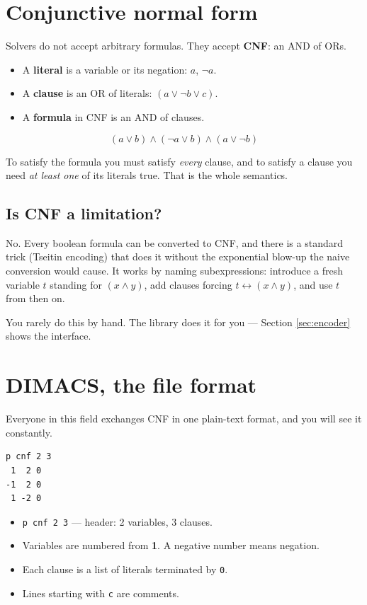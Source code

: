 \documentclass[11pt,a4paper]{article}
\begin{document}
\section{Conjunctive normal form}

Solvers do not accept arbitrary formulas. They accept \textbf{CNF}: an AND of
ORs.

\begin{itemize}
\item A \textbf{literal} is a variable or its negation: $a$, $\lnot a$.
\item A \textbf{clause} is an OR of literals: $(a \lor \lnot b \lor c)$.
\item A \textbf{formula} in CNF is an AND of clauses.
\end{itemize}

\[
(a \lor b) \land (\lnot a \lor b) \land (a \lor \lnot b)
\]

To satisfy the formula you must satisfy \emph{every} clause, and to satisfy a
clause you need \emph{at least one} of its literals true. That is the whole
semantics.

\subsection*{Is CNF a limitation?}

No. Every boolean formula can be converted to CNF, and there is a standard
trick (Tseitin encoding) that does it without the exponential blow-up the naive
conversion would cause. It works by naming subexpressions: introduce a fresh
variable $t$ standing for $(x \land y)$, add clauses forcing
$t \leftrightarrow (x \land y)$, and use $t$ from then on.

You rarely do this by hand. The library does it for you --- Section
\ref{sec:encoder} shows the interface.

\section{DIMACS, the file format}

Everyone in this field exchanges CNF in one plain-text format, and you will see
it constantly.

\begin{lstlisting}[style=out]
p cnf 2 3
 1  2 0
-1  2 0
 1 -2 0
\end{lstlisting}

\begin{itemize}
\item \texttt{p cnf 2 3} --- header: 2 variables, 3 clauses.
\item Variables are numbered from \textbf{1}. A negative number means negation.
\item Each clause is a list of literals terminated by \texttt{0}.
\item Lines starting with \texttt{c} are comments.
\end{itemize}
\end{document}
